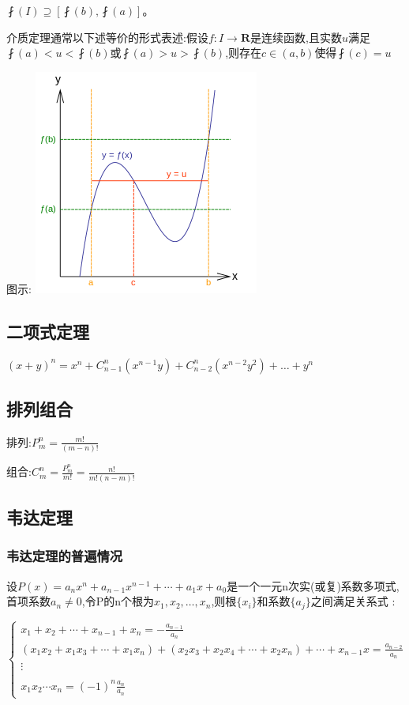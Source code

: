 \documentclass[UTF8]{ctexbook}
\newcommand{\mathCombination}[2]{C_{#1}^{#2}}
\newcommand{\mathPermutation}[2]{P_{#1}^{#2}}
\begin{document}
{{{$\fint(I)\supseteq[\fint(b), \fint(a)]$。

介质定理通常以下述等价的形式表述:假设$f:I\rightarrow\mathbf{R}$是连续函数,且实数$u$满足$\fint(a)<u<\fint(b)$或$\fint(a)>u>\fint(b)$,则存在$c\in(a,b)$使得$\fint(c) = u$

图示:
\includegraphics{resources/Intermediatevaluetheorem.png}
}%

\subsection{二项式定理}{
  $(x + y)^n = x^n + \mathCombination{n - 1}{n}(x^{n-1} y) + \mathCombination{n - 2}{n}(x^{n-2} y^2) + \dots + y^n$
}%

\subsection{排列组合}{
  排列:$\mathPermutation{m}{n} = \frac{m!}{(m-n)!}$

  组合:$\mathCombination{m}{n} = \frac{\mathPermutation{m}{n}}{m!} = \frac{n!}{m!(n-m)!}$
}%

\subsection{韦达定理}{
\subsubsection{韦达定理的普遍情况}{
设$P(x) = a_nx^n + a_{n-1}x^{n-1} + \dotsm + a_1x + a_0$是一个一元n次实(或复)系数多项式,首项系数$a_n \neq 0$,令P的n个根为$x_1,x_2,\dots,x_n$,则根$\{x_i\}$和系数$\{a_j\}$之间满足关系式 :

$$
  \begin{cases}
    x_1 + x_2 + \dotsm + x_{n-1} + x_n = -\frac{a_{n-1}}{a_n}                                                           \\
    (x_1x_2 + x_1x_3 + \dotsm + x_1x_n) + (x_2x_3 + x_2x_4 + \dotsm + x_2x_n) + \dotsm + x_{n-1}x = \frac{a_{n-2}}{a_n} \\
    \vdots                                                                                                              \\                                                                                                               \\
    x_1x_2 \dotsm x_n = (-1)^n\frac{a_n}{a_n}
  \end{cases}
$$

}}}}
\end{document}
